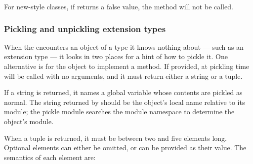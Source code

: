 \begin{notice}[warning]
  For new-style classes, if  returns a false
  value, the  method will not be called.
\end{notice}


\subsubsection{Pickling and unpickling extension types}

When the  encounters an object of a type it knows
nothing about --- such as an extension type --- it looks in two places
for a hint of how to pickle it.  One alternative is for the object to
implement a  method.  If provided, at pickling
time  will be called with no arguments, and it
must return either a string or a tuple.

If a string is returned, it names a global variable whose contents are
pickled as normal.  The string returned by  should
be the object's local name relative to its module; the pickle module
searches the module namespace to determine the object's module.

When a tuple is returned, it must be between two and five elements
long. Optional elements can either be omitted, or  can be provided 
as their value.  The semantics of each element are:

